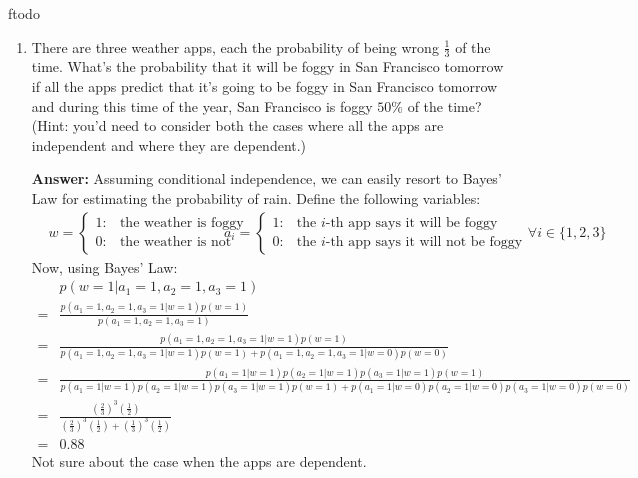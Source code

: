 ƒtodo\documentclass{article}
\newenvironment{QandA}{\begin{enumerate}[label=\arabic*.]}{\end{enumerate}}
\newenvironment{answer}{\par\normalfont \textbf{Answer:}}{}
\newcommand{\g}{\vert}
\begin{document}
\begin{QandA}
    \item There are three weather apps, each the probability of being wrong $\frac{1}{3}$ of the time. What's the probability that it will be foggy in San Francisco tomorrow if all the apps predict that it's going to be foggy in San Francisco tomorrow and during this time of the year, San Francisco is foggy $50\%$ of the time? (Hint: you’d need to consider both the cases where all the apps are independent and where they are dependent.)
    \begin{answer}
        Assuming conditional independence, we can easily resort to Bayes' Law  for estimating the probability of rain. Define the following variables:
        \begin{align*}
            &w = \begin{cases}
                1: &\text{the weather is foggy} \\
                0: &\text{the weather is not foggy}
            \end{cases}
            &a_i = \begin{cases}
                1: &\text{the $i$-th app says it will be foggy} \\
                0: &\text{the $i$-th app says it will not be foggy}
            \end{cases}
            \forall i \in \{1, 2, 3\}
        \end{align*}
        Now, using Bayes' Law:
        \begin{align*}
            &p(w=1 \g a_1 = 1, a_2 = 1, a_3 = 1) \\ = &\frac{p(a_1 = 1, a_2 = 1, a_3 = 1 \g w=1)p(w=1)}{p(a_1 = 1, a_2 = 1, a_3 = 1)} \\
            = &\frac{p(a_1 = 1, a_2 = 1, a_3 = 1 \g w=1)p(w=1)}{p(a_1 = 1, a_2 = 1, a_3 = 1 \g w = 1)p(w=1) + p(a_1 = 1, a_2 = 1, a_3 = 1 \g w = 0)p(w=0)} \\
            = &\frac{p(a_1=1 \g w = 1)p(a_2=1 \g w = 1)p(a_3=1 \g w = 1)p(w=1)}{p(a_1=1 \g w = 1)p(a_2=1 \g w = 1)p(a_3=1 \g w = 1)p(w=1) + p(a_1=1 \g w = 0)p(a_2=1 \g w = 0)p(a_3=1 \g w = 0)p(w=0)} \\
            = &\frac{\left(\frac{2}{3}\right)^3 \left( \frac{1}{2} \right)}{\left(\frac{2}{3}\right)^3 \left( \frac{1}{2} \right) + \left(\frac{1}{3}\right)^3 \left( \frac{1}{2} \right)} \\
            = &0.88
        \end{align*}
        Not sure about the case when the apps are dependent.
        

\end{answer}
\end{QandA}
\end{document}
